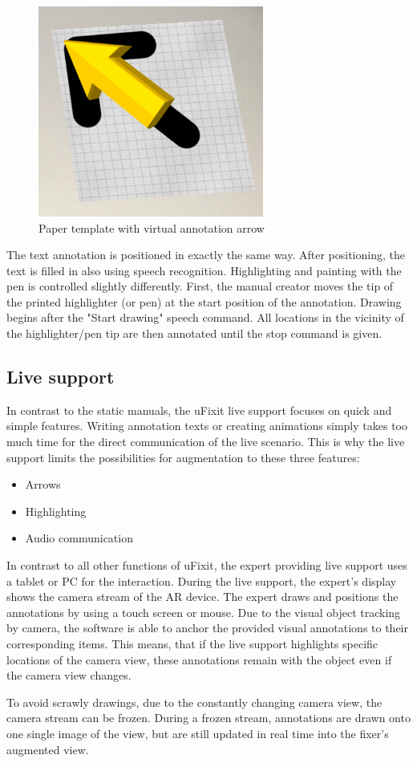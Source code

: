 \begin{figure}[H]
		\includegraphics[width=0.66\textwidth]{../images/paperArrowAugmented.png}
		\centering
		\caption{Paper template with virtual annotation arrow}
		\label{fig:cardBoard}
\end{figure}

The text annotation is positioned in exactly the same way. After positioning, the text is filled in also using speech recognition. Highlighting and painting with the pen is controlled slightly differently. First, the manual creator moves the tip of the printed highlighter (or pen) at the start position of the annotation. Drawing begins after the "Start drawing" speech command. All locations in the vicinity of the highlighter/pen tip are then annotated until the stop command is given.


\subsection{Live support}
In contrast to the static manuals, the uFixit live support focuses on quick and simple features. Writing annotation texts or creating animations simply takes too much time for the direct communication of the live scenario. This is why the live support limits the possibilities for augmentation to these three features:
\begin{itemize}
\item Arrows
\item Highlighting
\item Audio communication
\end{itemize}

In contrast to all other functions of uFixit, the expert providing live support uses a tablet or PC for the interaction. During the live support, the expert's display shows the camera stream of the AR device. The expert draws and positions the annotations by using a touch screen or mouse.
Due to the visual object tracking by camera, the software is able to anchor the provided visual annotations to their corresponding items. This means, that if the live support highlights specific locations of the camera view, these annotations remain with the object even if the camera view changes.

To avoid scrawly drawings, due to the constantly changing camera view, the camera stream can be frozen. During a frozen stream, annotations are drawn onto one single image of the view, but are still updated in real time into the fixer's augmented view.